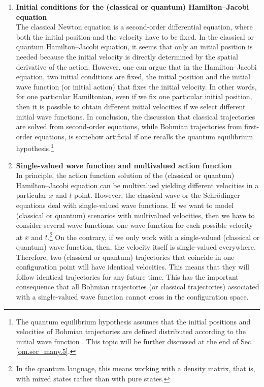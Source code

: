 \documentclass[nofootinbib, secnumarabic, amsmath, nobibnotes,10pt,aps,pra]{revtex4-1}
\newcommand{\sref}[1]{Sec. \ref{#1}}
\begin{document}
\begin{enumerate}
\begin{enumerate}
\item \textbf{Initial conditions for the (classical or quantum)  Hamilton--Jacobi equation} \\ The classical Newton equation is a second-order differential equation, where both the initial position and the velocity have to be fixed. In the classical or quantum Hamilton--Jacobi equation, it seems that only an initial position is needed because the initial velocity is directly determined by the spatial derivative of the action. However, one can argue that in the Hamilton--Jacobi equation, two initial conditions are fixed, the initial position and the initial wave function (or initial action) that fixes the initial velocity. In other words, for one particular Hamiltonian, even if we fix one particular initial position, then it is possible to obtain different initial velocities if we select different initial wave functions. In conclusion, the discussion that classical trajectories are solved from second-order equations, while Bohmian trajectories from first-order equations, is somehow artificial if one recalls the quantum equilibrium hypothesis.\footnote{The quantum equilibrium hypothesis assumes that the initial positions and velocities of Bohmian trajectories are defined distributed according to the initial wave function \cite{om.extra2,om.extra9,om.Valentini2006,om.nonequilibrium}. This topic will be further discussed at the end of \sref{om.sec_many.5}.}

\item \textbf{Single-valued wave function and multivalued action function} \\ In principle, the action function solution of the (classical or quantum) Hamilton--Jacobi equation can be multivalued yielding different velocities in a particular $x$ and $t$ point. However, the classical wave or the Schr\"odinger equations deal with single-valued wave functions. If we want to model (classical or quantum) scenarios with multivalued velocities, then we have to consider several wave functions, one wave function for each possible velocity at $x$ and $t$.\footnote{In the quantum language, this means working with a density matrix, that is, with mixed states rather than with pure states.} On the contrary, if we only work with a single-valued (classical or quantum) wave function, then, the velocity itself is single-valued everywhere. Therefore, two (classical or quantum) trajectories that coincide in one configuration point will have identical velocities. This means that they will follow identical trajectories for any future time. This has the important consequence that all Bohmian trajectories (or classical trajectories) associated with a single-valued wave function cannot cross in the configuration space.
\end{enumerate}

\end{enumerate}
\end{document}
